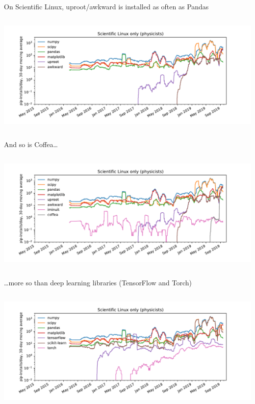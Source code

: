 \documentclass[aspectratio=169]{beamer}
\begin{document}
\begin{frame}{On Scientific Linux, uproot/awkward is installed as often as Pandas}
\vspace{0.5 cm}
\begin{columns}
\includegraphics[width=\linewidth]{pip-scilinux-uproot.pdf}
\end{columns}
\end{frame}

\begin{frame}{And so is Coffea\ldots}
\vspace{0.5 cm}
\begin{columns}
\includegraphics[width=\linewidth]{pip-scilinux-uproot-iminuit.pdf}
\end{columns}
\end{frame}

\begin{frame}{\ldots more so than deep learning libraries (TensorFlow and Torch)}
\vspace{0.5 cm}
\begin{columns}
\includegraphics[width=\linewidth]{pip-scilinux-ml.pdf}
\end{columns}
\end{frame}
\end{document}
